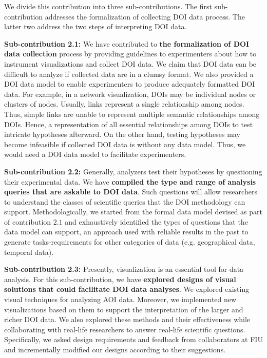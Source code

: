 We divide this contribution into three sub-contributions. The first sub-contribution addresses the formalization of collecting DOI data process. The latter two address the two steps of interpreting DOI data.  

\textbf{Sub-contribution 2.1:} We have contributed to \textbf{the formalization of DOI data collection} process by providing guidelines to experimenters about how to instrument visualizations and collect DOI data. We claim that DOI data can be difficult to analyze if collected data are in a clumsy format. We also provided a DOI data model to enable experimenters to produce adequately formatted DOI data. For example, in a network visualization, DOIs may be individual nodes or clusters of nodes. Usually,  links represent a single relationship among nodes. Thus, simple links are unable to represent multiple semantic relationships among DOIs. Hence, a representation of all essential relationships among DOIs to test intricate hypotheses afterward. On the other hand, testing hypotheses may become infeasible if collected DOI data is without any data model. Thus, we would need a DOI data model to facilitate experimenters. 

\textbf{Sub-contribution 2.2:} Generally, analyzers test their hypotheses by questioning their experimental data. We have \textbf{compiled the type and range of analysis queries that are askable to DOI data}. Such questions will allow researchers to understand the classes of scientific queries that the DOI methodology can support. Methodologically, we started from the formal data model devised as part of contribution $2.1$ and exhaustively identified the types of questions that the data model can support, an approach used with reliable results in the past to generate tasks-requirements for other categories of data (e.g. geographical data, temporal data). 

\textbf{Sub-contribution 2.3:} Presently, visualization is an essential tool for data analysis. For this sub-contribution, we have \textbf{explored designs of visual solutions that could facilitate DOI data analyses}. We explored existing visual techniques for analyzing AOI data. Moreover, we implemented new visualizations based on them to support the interpretation of the larger and richer DOI data. We also explored these methods and their effectiveness while collaborating with real-life researchers to answer real-life scientific questions. Specifically, we asked design requirements and feedback from collaborators at FIU and incrementally modified our designs according to their suggestions. 

